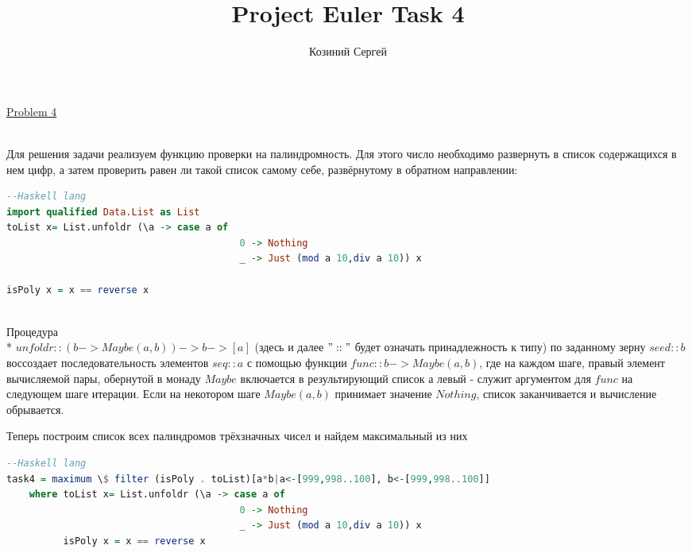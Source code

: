 \documentclass[11pt,a4paper]{article}
\title{Project Euler Task 4}
\author{Козиний Сергей}
\begin{document}
    
\maketitle
\href{''https://projecteuler.net/problem=4''}{Problem 4}

\\

Для решения задачи реализуем функцию проверки на палиндромность. Для этого число необходимо развернуть в список содержащихся в нем цифр, а затем проверить равен ли такой список самому себе, развёрнутому в обратном направлении:

\begin{lstlisting}[language=Haskell, frame=single]
  --Haskell lang
import qualified Data.List as List
toList x= List.unfoldr (\a -> case a of
                                         0 -> Nothing
                                         _ -> Just (mod a 10,div a 10)) x

isPoly x = x == reverse x
  
\end{lstlisting}
Процедура \\*
$unfoldr :: (b -> Maybe (a, b)) -> b -> [a] $ (здесь и далее $"::"$ будет означать принадлежность к типу)
по заданному зерну $seed :: b$ воссоздает последовательность элементов $seq :: a$ с помощью функции $func :: b -> Maybe (a, b)$, где на каждом шаге, правый элемент вычисляемой пары, обернутой в монаду $Maybe$ включается в результирующий список  а левый - служит аргументом для $func$ на следующем шаге итерации. Если на некотором шаге $Maybe(a,b)$ принимает значение $Nothing$, список заканчивается и вычисление обрывается. 

Теперь построим список всех палиндромов трёхзначных чисел и найдем максимальный из них
\begin{lstlisting}[language=Haskell, frame=single]
  --Haskell lang
task4 = maximum \$ filter (isPoly . toList)[a*b|a<-[999,998..100], b<-[999,998..100]]
    where toList x= List.unfoldr (\a -> case a of
                                         0 -> Nothing
                                         _ -> Just (mod a 10,div a 10)) x
          isPoly x = x == reverse x

\end{lstlisting} 
\end{document}
